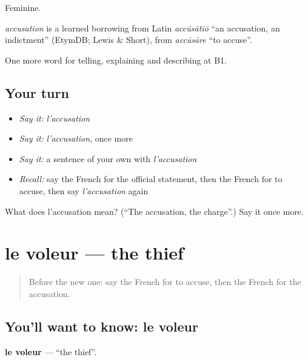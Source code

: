 Feminine.

\begin{cousinweb}
\emph{accusation} is a learned borrowing from Latin \emph{accūsātiō} \textquotedblleft{}an accusation, an indictment\textquotedblright{} (EtymDB; Lewis \& Short), from \emph{accūsāre} \textquotedblleft{}to accuse\textquotedblright{}.
\end{cousinweb}

\begin{grammarlens}[title={What you've built}]
One more word for telling, explaining and describing at B1.
\end{grammarlens}

\subsection*{Your turn}
\begin{itemize}
\raggedright
  \item \emph{Say it:} \emph{l'accusation}
  \item \emph{Say it:} \emph{l'accusation}, once more
  \item \emph{Say it:} a sentence of your own with \emph{l'accusation}
  \item \emph{Recall:} say the French for the official statement, then the French for to accuse, then say \emph{l'accusation} again
\end{itemize}

\begin{tcolorbox}[breakable,colback=teal!4,colframe=teal!35!black,title={Before you move on}]
What does l'accusation mean? (\textquotedblleft{}The accusation, the charge\textquotedblright{}.) Say it once more.
\end{tcolorbox}
\section[le voleur]{le voleur — the thief}

\label{lesson:FR-C386-voleur}



\begin{quote}
Before the new one: say the French for to accuse, then the French for the accusation.
\end{quote}

\subsection*{You'll want to know: le voleur}
\textbf{le voleur} — \textquotedblleft{}the thief\textquotedblright{}.


